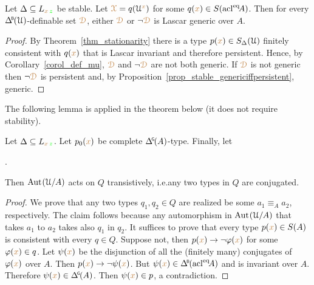 \begin{corollary}\label{corol_stable_generic}
  Let $\Delta\subseteq L_{{\color{brown} x}\,{\color{green} z}}$ be stable.
  Let ${\color{brown}\EuScript X}=q(\EuScript U^{\color{brown} x})$ for some $q({\color{brown} x})\in S({\rm acl}^{{\rm eq}}\!A)$.
  Then for every $\BDelta(\U)$-definable set ${\color{brown}\EuScript D}$, either ${\color{brown}\EuScript D}$ or $\neg{\color{brown}\EuScript D}$ is Lascar generic over $A$.
\end{corollary}

\begin{proof}
  By Theorem~\ref{thm_stationarity} there is a type $p({\color{brown} x})\in S_\Delta(\EuScript U)$ finitely consistent with $q({\color{brown} x})$ that is Lascar invariant and therefore persistent.
  Hence, by Corollary~\ref{corol_def_mu}, ${\color{brown}\EuScript D}$ and $\neg{\color{brown}\EuScript D}$ are not both generic.
  If ${\color{brown}\EuScript D}$ is not generic then $\neg{\color{brown}\EuScript D}$ is persistent and, by Proposition~\ref{prop_stable_genericiffpersistent}, generic.
\end{proof}

The following lemma is applied in the theorem below (it does not require stability).

\begin{lemma}
  Let $\Delta\subseteq L_{{\color{brown} x}\,{\color{green} z}}$.
  Let $p_0({\color{brown} x})$ be complete $\GDelta(A)$-type.
  Finally, let 
  
  .
  
  Then ${\rm Aut\kern.15ex}(\EuScript U/A)$ acts on $Q$ transistively, i.e.\@ any two types in $Q$ are conjugated.
\end{lemma}

\begin{proof}
  We prove that any two types $q_1,q_2\in Q$ are realized be some $a_1\equiv_Aa_2$, respectively.
  The claim follows because any automorphism in ${\rm Aut\kern.15ex}(\EuScript U/A)$ that takes $a_1$ to $a_2$ takes also $q_1$ in $q_2$.
  It suffices to prove that every type $p({\color{brown} x})\in S(A)$ is consistent with every $q\in Q$.
  Suppose not, then $p({\color{brown} x})\rightarrow\neg\varphi({\color{brown} x})$ for some $\varphi({\color{brown} x})\in q$.
  Let $\psi({\color{brown} x})$ be the disjunction of all the (finitely many) conjugates of $\varphi({\color{brown} x})$ over $A$.
  Then $p({\color{brown} x})\rightarrow\neg\psi({\color{brown} x})$.
  But $\psi({\mr x})\in\BDelta(\acl^\eq\!A)$ and is invariant over $A$.
  Therefore $\psi({\mr x})\in\GDelta(A)$.
  Then $\psi({\color{brown} x})\in p$, a contradiction.
\end{proof}

